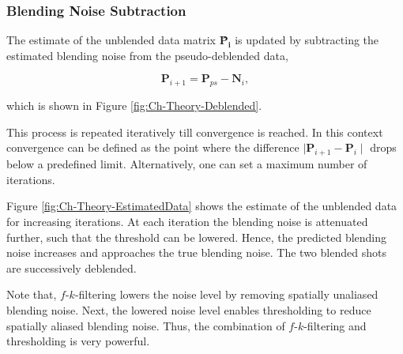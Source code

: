 \subsubsection*{Blending Noise Subtraction} 

The estimate of the unblended data matrix \textbf{\^{P}}$_\textbf{i}$ is updated by subtracting the estimated blending noise from the pseudo-deblended data,

\begin{equation}
	\textbf{\^P}_{i+1} = \textbf{P}_{ps} - \textbf{\^{N}}_{i}, 
	\label{eq:Ch-Theory-DataUpdate1}
\end{equation}

which is shown in Figure \ref{fig:Ch-Theory-Deblended}.

This process is repeated iteratively till convergence is reached. In this context convergence can be defined as the point where the difference $\mid \textbf{\^P}_{i+1} - \textbf{\^{P}}_{i} \mid$ drops below a predefined limit. Alternatively, one can set a maximum number of iterations. 

Figure \ref{fig:Ch-Theory-EstimatedData} shows the estimate of the unblended data for increasing iterations. At each iteration the blending noise is attenuated further, such that the threshold can be lowered. Hence, the predicted blending noise increases and approaches the true blending noise. The two blended shots are successively  deblended.

Note that, $f$-$k$-filtering lowers the noise level by removing spatially unaliased blending noise. Next, the lowered noise level enables thresholding to reduce spatially aliased blending noise. Thus, the combination of $f$-$k$-filtering and thresholding is very powerful.


